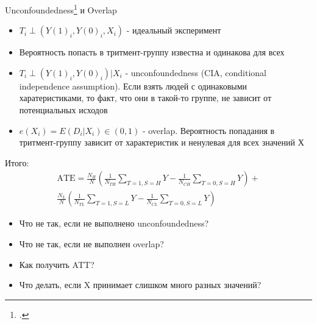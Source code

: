 \begin{frame}{Unconfoundedness\footcite[Раздел 3.2.1]{angrist2008mostly} и Overlap}
\begin{itemize}
   \item $T_i \perp (Y(1)_i, Y(0)_i, X_i)$ - идеальный эксперимент
   \item Вероятность попасть в тритмент-группу известна и одинакова для всех
   \item $T_i \perp (Y(1)_i, Y(0)_i) | X_i$ - unconfoundedness (CIA, conditional independence assumption). Если взять людей с одинаковыми харатеристиками, то факт, что они в такой-то группе, не зависит от потенциальных исходов
   \item $e(X_i)=E(D_i | X_i) \in (0,1) $ - overlap. Вероятность попадания в тритмент-группу зависит от характеристик и ненулевая для всех значений Х
\end{itemize}
\end{frame}

\begin{frame}{Итого:}
\begin{gather*}
\text{ATE} = \frac{N_H}{N} \left(\frac{1}{N_{TH}}\sum_{T=1, S=H} Y - \frac{1}{N_{CH}}\sum_{T=0,S=H} Y \right)+ \\
\frac{N_L}{N} \left(\frac{1}{N_{TL}}\sum_{T=1, S=L} Y - \frac{1}{N_{CL}}\sum_{T=0,S=L} Y \right)
\end{gather*}

\begin{itemize}
    \item Что не так, если не выполнено unconfoundedness?
    \item Что не так, если не выполнен overlap?
    \item Как получить ATT?
    \item Что делать, если X принимает слишком много разных значений?
\end{itemize}
\end{frame}

